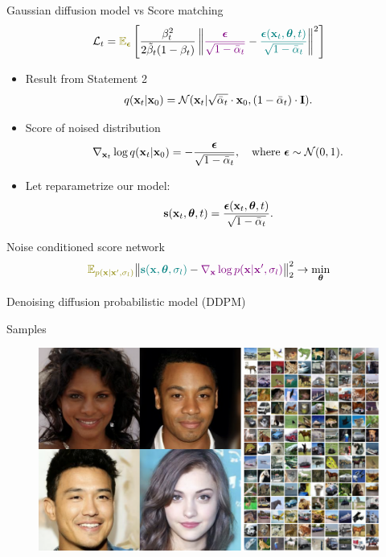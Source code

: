 \begin{frame}{Gaussian diffusion model vs Score matching}
	\vspace{-0.3cm}
	\[
		\cL_t = {\color{olive}\bbE_{\bepsilon}} \left[ \frac{\beta_t^2}{2\tilde{\beta}_t (1 - \beta_t)} \left\| {\color{violet}\frac{\bepsilon}{\sqrt{1 - \bar{\alpha}_t}}} - {\color{teal}\frac{\bepsilon(\bx_t, \btheta, t)}{\sqrt{1 - \bar{\alpha}_t}}}\right\|^2 \right]
	\]
	\begin{itemize}
		\item Result from Statement 2
		\[
			q(\mathbf{x}_t | \mathbf{x}_0) = \mathcal{N}(\mathbf{x}_t | \sqrt{\bar{\alpha}_t} \cdot \mathbf{x}_0, (1 - \bar{\alpha}_t) \cdot \mathbf{I}).
		\]
		\item Score of noised distribution
		\[
			\nabla_{\mathbf{x}_t} \log q(\mathbf{x}_t | \mathbf{x}_0) = - \frac{\boldsymbol{\epsilon}}{\sqrt{1 - \bar{\alpha}_t}}, \quad \text{where } \boldsymbol{\epsilon} \sim \mathcal{N}(0, 1).
		\]
		\item Let reparametrize our model: 
		\[
			\mathbf{s}(\mathbf{x}_t, \boldsymbol{\theta}, t) = \frac{\boldsymbol{\epsilon}(\mathbf{x}_t, \boldsymbol{\theta}, t)}{\sqrt{1 - \bar{\alpha}_t}}.
		\]
	\end{itemize}
	\begin{block}{Noise conditioned score network}
		\vspace{-0.2cm}
		\[
			{\color{olive}\bbE_{p(\bx | \bx', \sigma_l)}}\bigl\| {\color{teal}\bs(\bx, \btheta, \sigma_l)} - {\color{violet}\nabla_\bx \log p(\bx | \bx', \sigma_l)} \bigr\|^2_2 \rightarrow \min_{\btheta}
		\]
	\end{block}
	\end{frame}
\begin{frame}{Denoising diffusion probabilistic model (DDPM)}
	\begin{block}{Samples}
		\begin{figure}
			\includegraphics[width=\linewidth]{figs/ddpm_samples}
		\end{figure}
	\end{block}
\end{frame}
